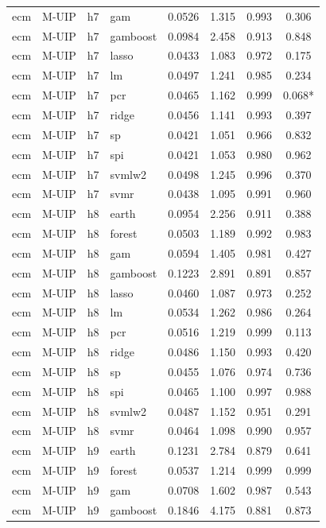 \begin{ThreePartTable}
\begin{longtable}[t]{llclcccc}
ecm & M-UIP & h7 & gam & 0.0526 & 1.315 & 0.993 & 0.306\\
ecm & M-UIP & h7 & gamboost & 0.0984 & 2.458 & 0.913 & 0.848\\
ecm & M-UIP & h7 & lasso & 0.0433 & 1.083 & 0.972 & 0.175\\
ecm & M-UIP & h7 & lm & 0.0497 & 1.241 & 0.985 & 0.234\\
ecm & M-UIP & h7 & pcr & 0.0465 & 1.162 & 0.999 & 0.068*\\
ecm & M-UIP & h7 & ridge & 0.0456 & 1.141 & 0.993 & 0.397\\
ecm & M-UIP & h7 & sp & 0.0421 & 1.051 & 0.966 & 0.832\\
ecm & M-UIP & h7 & spi & 0.0421 & 1.053 & 0.980 & 0.962\\
ecm & M-UIP & h7 & svmlw2 & 0.0498 & 1.245 & 0.996 & 0.370\\
ecm & M-UIP & h7 & svmr & 0.0438 & 1.095 & 0.991 & 0.960\\
\addlinespace
ecm & M-UIP & h8 & earth & 0.0954 & 2.256 & 0.911 & 0.388\\
ecm & M-UIP & h8 & forest & 0.0503 & 1.189 & 0.992 & 0.983\\
ecm & M-UIP & h8 & gam & 0.0594 & 1.405 & 0.981 & 0.427\\
ecm & M-UIP & h8 & gamboost & 0.1223 & 2.891 & 0.891 & 0.857\\
ecm & M-UIP & h8 & lasso & 0.0460 & 1.087 & 0.973 & 0.252\\
ecm & M-UIP & h8 & lm & 0.0534 & 1.262 & 0.986 & 0.264\\
ecm & M-UIP & h8 & pcr & 0.0516 & 1.219 & 0.999 & 0.113\\
ecm & M-UIP & h8 & ridge & 0.0486 & 1.150 & 0.993 & 0.420\\
ecm & M-UIP & h8 & sp & 0.0455 & 1.076 & 0.974 & 0.736\\
ecm & M-UIP & h8 & spi & 0.0465 & 1.100 & 0.997 & 0.988\\
ecm & M-UIP & h8 & svmlw2 & 0.0487 & 1.152 & 0.951 & 0.291\\
ecm & M-UIP & h8 & svmr & 0.0464 & 1.098 & 0.990 & 0.957\\
\addlinespace
ecm & M-UIP & h9 & earth & 0.1231 & 2.784 & 0.879 & 0.641\\
ecm & M-UIP & h9 & forest & 0.0537 & 1.214 & 0.999 & 0.999\\
ecm & M-UIP & h9 & gam & 0.0708 & 1.602 & 0.987 & 0.543\\
ecm & M-UIP & h9 & gamboost & 0.1846 & 4.175 & 0.881 & 0.873\\

\end{longtable}
\end{ThreePartTable}
